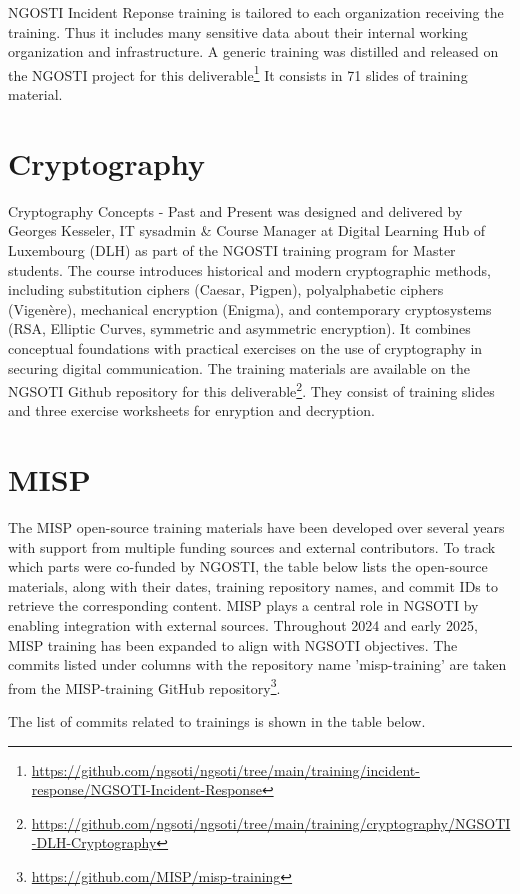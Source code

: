 \documentclass[10pt,a4paper]{report}
\begin{document}
NGOSTI Incident Reponse training is tailored to each organization receiving the
training. Thus it includes many sensitive data about their internal working
organization and infrastructure.
A generic training was distilled and released on the NGOSTI project for this
deliverable\footnote{\url{https://github.com/ngsoti/ngsoti/tree/main/training/incident-response/NGSOTI-Incident-Response}}
It consists in 71 slides of training material.

\section{Cryptography}

Cryptography Concepts - Past and Present was designed and delivered by Georges Kesseler, IT sysadmin \& Course Manager at Digital Learning Hub of Luxembourg (DLH) as part of the NGOSTI training program for Master students. The course introduces historical and modern cryptographic methods, including substitution ciphers (Caesar, Pigpen), polyalphabetic ciphers (Vigenère), mechanical encryption (Enigma), and contemporary cryptosystems (RSA, Elliptic Curves, symmetric and asymmetric encryption). It combines conceptual foundations with practical exercises on the use of cryptography in securing digital communication. The training materials are available on the NGSOTI Github repository for this deliverable\footnote{\url{https://github.com/ngsoti/ngsoti/tree/main/training/cryptography/NGSOTI-DLH-Cryptography}}. They consist of training slides and three exercise worksheets for enryption and decryption.

\section{MISP}
The MISP open-source training materials have been developed over several years
with support from multiple funding sources and external contributors. To track
which parts were co-funded by NGOSTI, the table below lists the open-source
materials, along with their dates, training repository names, and commit IDs
to retrieve the corresponding content.
MISP plays a central role in NGSOTI by enabling integration with external
sources. Throughout 2024 and early 2025, MISP training has been expanded to
align with NGSOTI objectives. The commits listed under columns with the
repository name 'misp-training' are taken from the MISP-training GitHub
repository\footnote{\url{https://github.com/MISP/misp-training}}.


The list of commits related to trainings is shown in the table below.
\end{document}
